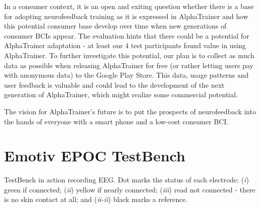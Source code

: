 \documentclass[a4paper,10pt,english,lof,lot,twoside]{puthesis}
\begin{document}
In a consumer context, it is an open and exiting question whether there is a base for adopting neurofeedback training as it is expressed in AlphaTrainer and how this potential consumer base develop over time when new generations of consumer BCIs appear. The evaluation hints that there could be a potential for AlphaTrainer adaptation - at least our 4 test participants found value in using AlphaTrainer. To further investigate this potential, our plan is to collect as much data as possible when releasing AlphaTrainer for free (or rather letting users pay with anonymous data) to the Google Play Store. This data, usage patterns and user feedback is valuable and could lead to the development of the next generation of AlphaTrainer, which might realize some commercial potential.

The vision for AlphaTrainer's future is to put the prospects of neurofeedback into the hands of everyone with a smart phone and a low-cost consumer BCI.

\appendix
{}\label{appendix_background_testbench::doc}

\chapter{Emotiv EPOC TestBench}
\label{appendix_background_testbench:appendix-background-testbench}\label{appendix_background_testbench:emotiv-epoc-testbench}
TestBench in action recording EEG. Dot marks the status of each
electrode: (\emph{i}) green if connected; (\emph{ii}) yellow if nearly
connected; (\emph{iii}) read not connected - there is no skin contact at
all; and (\emph{ii-ii}) black marks a reference.

{\hfill}
\label{appendix_background_truesense_console::doc}
\end{document}
